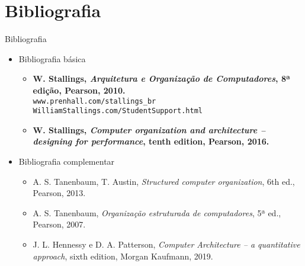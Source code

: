    \section[ slide = true]{Bibliografia}
      \begin{slide}[toc=]{Bibliografia}
         \begin{itemize}
            \item Bibliografia básica
            \begin{itemize}
               \item \textbf{W. Stallings, \emph{Arquitetura e Organização de Computadores}, 8ª edição, Pearson,  2010.}\\ \texttt{www.prenhall.com/stallings\_br}\\ \texttt{WilliamStallings.com/StudentSupport.html}
               \item \textbf{W. Stallings, \emph{Computer organization and architecture -- designing for performance}, tenth edition, Pearson,  2016.}
            \end{itemize}
            \item Bibliografia complementar
            \begin{itemize}
               \item {A. S. Tanenbaum, T. Austin, \emph{Structured computer organization}, 6th ed., Pearson, 2013.} 
               \item {A. S. Tanenbaum, \emph{Organização estruturada de computadores}, 5ª ed., Pearson, 2007.} 
               \item J. L. Hennessy e D. A. Patterson, \emph{Computer Architecture -- a quantitative approach}, sixth edition, Morgan Kaufmann, 2019.
            \end{itemize}
         \end{itemize}
      \end{slide}

